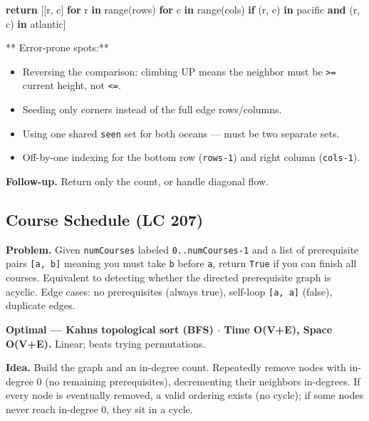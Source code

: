 \documentclass[11pt]{article}
\providecommand{\tightlist}{\setlength{\itemsep}{1pt}\setlength{\parskip}{0pt}}
\newenvironment{Shaded}{\begin{snugshade}}{\end{snugshade}}
\newcommand{\BuiltInTok}[1]{\textcolor[rgb]{0.50,0.55,0.55}{#1}}
\newcommand{\ControlFlowTok}[1]{\textcolor[rgb]{0.99,0.74,0.29}{\textbf{#1}}}
\newcommand{\KeywordTok}[1]{\textcolor[rgb]{0.81,0.81,0.76}{\textbf{#1}}}
\newcommand{\NormalTok}[1]{\textcolor[rgb]{0.81,0.81,0.76}{#1}}
\begin{document}
\begin{Shaded}
\begin{Highlighting}[]
    \ControlFlowTok{return}\NormalTok{ [[r, c] }\ControlFlowTok{for}\NormalTok{ r }\KeywordTok{in} \BuiltInTok{range}\NormalTok{(rows) }\ControlFlowTok{for}\NormalTok{ c }\KeywordTok{in} \BuiltInTok{range}\NormalTok{(cols)}
            \ControlFlowTok{if}\NormalTok{ (r, c) }\KeywordTok{in}\NormalTok{ pacific }\KeywordTok{and}\NormalTok{ (r, c) }\KeywordTok{in}\NormalTok{ atlantic]}
\end{Highlighting}
\end{Shaded}

** Error-prone spots:**

\begin{itemize}
\tightlist
\item
  Reversing the comparison: climbing UP means the neighbor must be \texttt{\textgreater{}=} current height, not \texttt{\textless{}=}.
\item
  Seeding only corners instead of the full edge rows/columns.
\item
  Using one shared \texttt{seen} set for both oceans --- must be two separate sets.
\item
  Off-by-one indexing for the bottom row (\texttt{rows-1}) and right column (\texttt{cols-1}).
\end{itemize}

\textbf{Follow-up.} Return only the count, or handle diagonal flow.

\subsection{Course Schedule (LC 207)}\label{course-schedule-lc-207}

\textbf{Problem.} Given \texttt{numCourses} labeled \texttt{0..numCourses-1} and a list of prerequisite pairs \texttt{{[}a,\ b{]}} meaning you must take \texttt{b} before \texttt{a}, return \texttt{True} if you can finish all courses. Equivalent to detecting whether the directed prerequisite graph is acyclic. Edge cases: no prerequisites (always true), self-loop \texttt{{[}a,\ a{]}} (false), duplicate edges.

\textbf{Optimal --- Kahn\textquotesingle s topological sort (BFS) \(\cdot\) Time O(V+E), Space O(V+E).} Linear; beats trying permutations.

\textbf{Idea.} Build the graph and an in-degree count. Repeatedly remove nodes with in-degree 0 (no remaining prerequisites), decrementing their neighbors\textquotesingle{} in-degrees. If every node is eventually removed, a valid ordering exists (no cycle); if some nodes never reach in-degree 0, they sit in a cycle.
\end{document}
